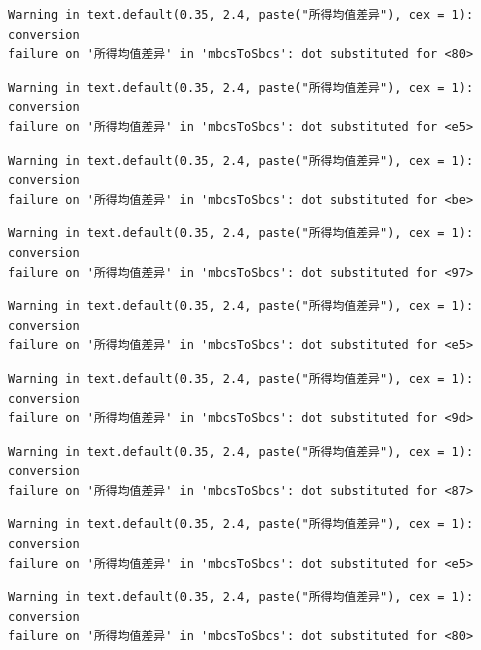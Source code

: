\documentclass[
  letterpaper,
  DIV=11,
  numbers=noendperiod]{scrreprt}
\begin{document}
\begin{verbatim}
Warning in text.default(0.35, 2.4, paste("所得均值差异"), cex = 1): conversion
failure on '所得均值差异' in 'mbcsToSbcs': dot substituted for <80>
\end{verbatim}

\begin{verbatim}
Warning in text.default(0.35, 2.4, paste("所得均值差异"), cex = 1): conversion
failure on '所得均值差异' in 'mbcsToSbcs': dot substituted for <e5>
\end{verbatim}

\begin{verbatim}
Warning in text.default(0.35, 2.4, paste("所得均值差异"), cex = 1): conversion
failure on '所得均值差异' in 'mbcsToSbcs': dot substituted for <be>
\end{verbatim}

\begin{verbatim}
Warning in text.default(0.35, 2.4, paste("所得均值差异"), cex = 1): conversion
failure on '所得均值差异' in 'mbcsToSbcs': dot substituted for <97>
\end{verbatim}

\begin{verbatim}
Warning in text.default(0.35, 2.4, paste("所得均值差异"), cex = 1): conversion
failure on '所得均值差异' in 'mbcsToSbcs': dot substituted for <e5>
\end{verbatim}

\begin{verbatim}
Warning in text.default(0.35, 2.4, paste("所得均值差异"), cex = 1): conversion
failure on '所得均值差异' in 'mbcsToSbcs': dot substituted for <9d>
\end{verbatim}

\begin{verbatim}
Warning in text.default(0.35, 2.4, paste("所得均值差异"), cex = 1): conversion
failure on '所得均值差异' in 'mbcsToSbcs': dot substituted for <87>
\end{verbatim}

\begin{verbatim}
Warning in text.default(0.35, 2.4, paste("所得均值差异"), cex = 1): conversion
failure on '所得均值差异' in 'mbcsToSbcs': dot substituted for <e5>
\end{verbatim}

\begin{verbatim}
Warning in text.default(0.35, 2.4, paste("所得均值差异"), cex = 1): conversion
failure on '所得均值差异' in 'mbcsToSbcs': dot substituted for <80>
\end{verbatim}
\end{document}
